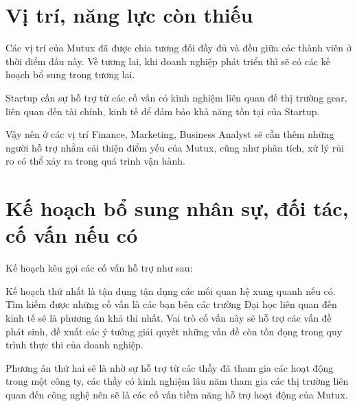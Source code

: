 \section{Vị trí, năng lực còn thiếu}
Các vị trí của Mutux đã được chia tương đối đầy đủ và đều giữa các thành viên ở thời điểm đầu này. Về tương lai, khi doanh nghiệp phát triển thì sẽ có các kế hoạch bổ sung trong tương lai.

Startup cần sự hỗ trợ từ các cố vấn có kinh nghiệm liên quan đế thị trường gear, liên quan đến tài chính, kinh tế để đảm bảo khả năng tồn tại của Startup.

Vậy nên ở các vị trí Finance, Marketing, Business Analyst sẽ cần thêm những người hỗ trợ nhằm cải thiện điểm yếu của Mutux, cũng như phân tích, xử lý rủi ro có thể xảy ra trong quá trình vận hành.

\section{Kế hoạch bổ sung nhân sự, đối tác, cố vấn nếu có}
Kế hoạch kêu gọi các cố vấn hỗ trợ như sau:


Kế hoạch thứ nhất là tận dụng tận dụng các mối quan hệ xung quanh nếu có. Tìm kiếm được những cố vấn là các bạn bên các trường Đại học liên quan đến kinh tế sẽ là phương án khả thi nhất.
Vai trò cố vấn này sẽ hỗ trợ các vấn đề phát sinh, đề xuất các ý tưởng giải quyết những vấn đề còn tồn đọng trong quy trình thực thi của doanh nghiệp.

Phương án thứ hai sẽ là nhờ sự hỗ trợ từ các thầy đã tham gia các hoạt động trong một công ty, các thầy có kinh nghiệm lâu năm tham gia các thị trường liên quan đến công nghệ nên sẽ là các cố vấn tiềm năng hỗ trợ hoạt động của Mutux.

